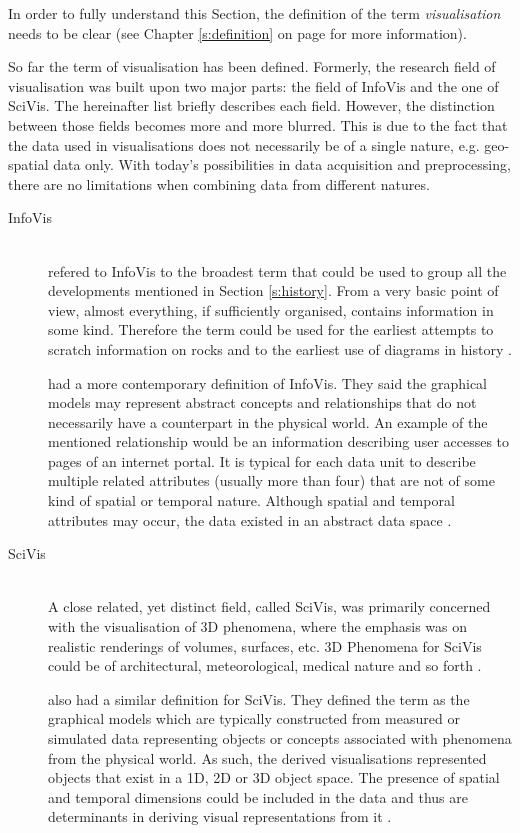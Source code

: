 \cbstart
In order to fully understand this Section, the definition of the term \textit{visualisation} needs to be clear (see Chapter \ref{s:definition} on page \pageref{s:definition} for more information).

So far the term of visualisation has been defined. Formerly, the research field of visualisation was built upon two major parts: the field of \ac{InfoVis} and the one of \ac{SciVis}. The hereinafter list briefly describes each field. However, the distinction between those fields becomes more and more blurred. This is due to the fact that the data used in visualisations does not necessarily be of a single nature, e.g. geo-spatial data only. With today's possibilities in data acquisition and preprocessing, there are no limitations when combining data from different natures.

\begin{description}

\item[\acl{InfoVis}] \hfill \\
\citeauthor{Friendly.2001} refered to \ac{InfoVis} to the broadest term that could be used to group all the developments mentioned in Section \ref{s:history}. From a very basic point of view, almost everything, if sufficiently organised, contains information in some kind. Therefore the term could be used for the earliest attempts to scratch information on rocks and to the earliest use of diagrams in history .

\citeauthor{Ferreira2003} had a more contemporary definition of \ac{InfoVis}. They said the graphical models may represent abstract concepts and relationships that do not necessarily have a counterpart in the physical world. An example of the mentioned relationship would be an information describing user accesses to pages of an internet portal. It is typical for each data unit to describe multiple related attributes (usually more than four) that are not of some kind of spatial or temporal nature. Although spatial and temporal attributes may occur, the data existed in an abstract data space .

\item[\acl{SciVis}] \hfill \\
A close related, yet distinct field, called \ac{SciVis}, was primarily concerned with the visualisation of 3D phenomena, where the emphasis was on realistic renderings of volumes, surfaces, etc. 3D Phenomena for \ac{SciVis} could be of architectural, meteorological, medical nature and so forth .

\citeauthor{Ferreira2003} also had a similar definition for \ac{SciVis}. They defined the term as the graphical models which are typically constructed from measured or simulated data representing objects or concepts associated with phenomena from the physical world. As such, the derived visualisations represented objects that exist in a 1D, 2D or 3D object space. The presence of spatial and temporal dimensions could be included in the data and thus are determinants in deriving visual representations from it .
\end{description}

